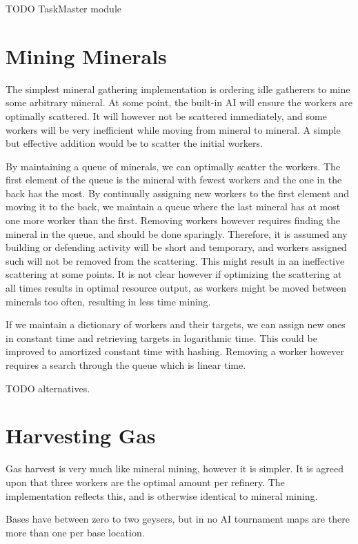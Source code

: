 TODO TaskMaster module

\section{Mining Minerals}
The simplest mineral gathering implementation is ordering idle gatherers to mine some arbitrary mineral. At some point, the built-in AI will ensure the workers are optimally scattered. It will however not be scattered immediately, and some workers will be very inefficient while moving from mineral to mineral. A simple but effective addition would be to scatter the initial workers.

By maintaining a queue of minerals, we can optimally scatter the workers. The first element of the queue is the mineral with fewest workers and the one in the back has the most. By continually assigning new workers to the first element and moving it to the back, we maintain a queue where the last mineral has at most one more worker than the first. Removing workers however requires finding the mineral in the queue, and should be done sparingly. Therefore, it is assumed any building or defending activity will be short and temporary, and workers assigned such will not be removed from the scattering. This might result in an ineffective scattering at some points. It is not clear however if optimizing the scattering at all times results in optimal resource output, as workers might be moved between minerals too often, resulting in less time mining.

If we maintain a dictionary of workers and their targets, we can assign new ones in constant time and retrieving targets in logarithmic time. This could be improved to amortized constant time with hashing. Removing a worker however requires a search through the queue which is linear time.

TODO alternatives.

\section{Harvesting Gas}	
Gas harvest is very much like mineral mining, however it is simpler. It is agreed upon that three workers are the optimal amount per refinery. The implementation reflects this, and is otherwise identical to mineral mining.

Bases have between zero to two geysers, but in no AI tournament maps are there more than one per base location.

